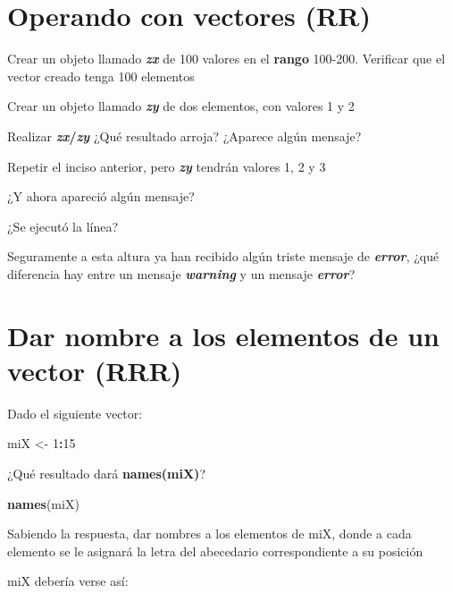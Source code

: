 \documentclass[]{book}
\newenvironment{Shaded}{\begin{snugshade}}{\end{snugshade}}
\newcommand{\DecValTok}[1]{\textcolor[rgb]{0.00,0.00,0.81}{#1}}
\newcommand{\KeywordTok}[1]{\textcolor[rgb]{0.13,0.29,0.53}{\textbf{#1}}}
\newcommand{\NormalTok}[1]{#1}
\newcommand{\OperatorTok}[1]{\textcolor[rgb]{0.81,0.36,0.00}{\textbf{#1}}}
\newcommand{\StringTok}[1]{\textcolor[rgb]{0.31,0.60,0.02}{#1}}
\begin{document}
\hypertarget{operando-con-vectores-rr}{%
\section{Operando con vectores (RR)}\label{operando-con-vectores-rr}}

Crear un objeto llamado \textbf{\emph{zx}} de 100 valores en el \textbf{rango} 100-200. Verificar que el vector creado tenga 100 elementos

Crear un objeto llamado \textbf{\emph{zy}} de dos elementos, con valores 1 y 2

Realizar \textbf{\emph{zx}/\emph{zy}} ¿Qué resultado arroja? ¿Aparece algún mensaje?

Repetir el inciso anterior, pero \textbf{\emph{zy}} tendrán valores 1, 2 y 3

¿Y ahora apareció algún mensaje?

¿Se ejecutó la línea?

Seguramente a esta altura ya han recibido algún triste mensaje de \textbf{\emph{error}}, ¿qué diferencia hay entre un mensaje \textbf{\emph{warning}} y un mensaje \textbf{\emph{error}}?

\hypertarget{dar-nombre-a-los-elementos-de-un-vector-rrr}{%
\section{Dar nombre a los elementos de un vector (RRR)}\label{dar-nombre-a-los-elementos-de-un-vector-rrr}}

Dado el siguiente vector:

\begin{Shaded}
\begin{Highlighting}[]
\NormalTok{miX <-}\StringTok{ }\DecValTok{1}\OperatorTok{:}\DecValTok{15}
\end{Highlighting}
\end{Shaded}

¿Qué resultado dará \textbf{names(miX)}?

\begin{Shaded}
\begin{Highlighting}[]
\KeywordTok{names}\NormalTok{(miX)}
\end{Highlighting}
\end{Shaded}

Sabiendo la respuesta, dar nombres a los elementos de miX, donde a cada elemento se le asignará la letra del abecedario correspondiente a su posición

miX debería verse así:
\end{document}
